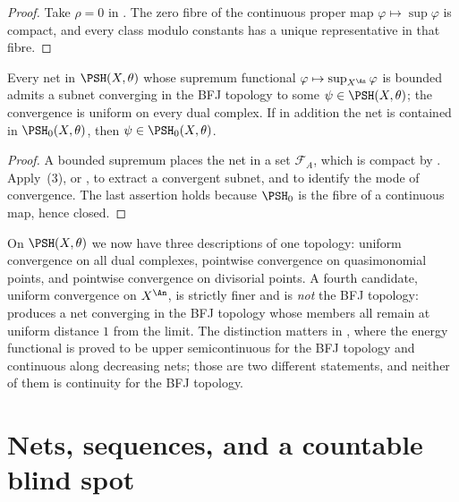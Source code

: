 \begin{proof}
Take $\rho=0$ in .  The zero fibre of
the continuous proper map $\varphi\mapsto\sup\varphi$ is compact, and
every class modulo constants has a unique representative in that fibre.
\end{proof}

\begin{corollary}
\label{cor:ch22-net-compactness}
Every net in $\PSH(X,\theta)$ whose supremum functional
$\varphi\mapsto\sup_{X^{\An}}\varphi$ is bounded admits a subnet
converging in the BFJ topology to some $\psi\in\PSH(X,\theta)$; the
convergence is uniform on every dual complex.  If in addition the net is
contained in $\PSH_0(X,\theta)$, then $\psi\in\PSH_0(X,\theta)$.
\end{corollary}

\begin{proof}
A bounded supremum places the net in a set $\mathcal F_A$, which is
compact by .  Apply
\,(3), or , to
extract a convergent subnet, and  to
identify the mode of convergence.  The last assertion holds because
$\PSH_0$ is the fibre of a continuous map, hence closed.
\end{proof}

\begin{remark}
\label{rem:ch22-topology-comparison}
On $\PSH(X,\theta)$ we now have three descriptions of one topology:
uniform convergence on all dual complexes, pointwise convergence on
quasimonomial points, and pointwise convergence on divisorial points.  A
fourth candidate, uniform convergence on $X^{\An}$, is strictly finer and
is \emph{not} the BFJ topology:  produces
a net converging in the BFJ topology whose members all remain at uniform
distance $1$ from the limit.  The distinction matters in
, where the energy functional is proved to be upper
semicontinuous for the BFJ topology and continuous along decreasing nets;
those are two different statements, and neither of them is continuity for
the BFJ topology.
\end{remark}

\section{Nets, sequences, and a countable blind spot}
\label{sec:ch22-nets}

